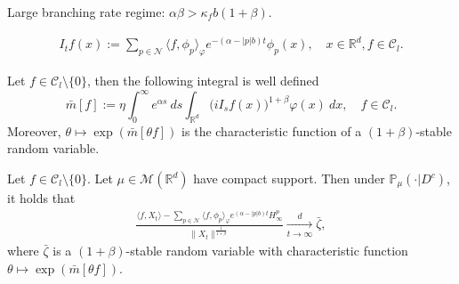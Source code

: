 \documentclass[9pt]{beamer}
\begin{document}
\begin{frame}[allowframebreaks]{Large branching rate regime: $\alpha\beta > \kappa_f b (1+\beta)$.}
\begin{itemize}
\begin{align}\label{definition of Itf}
    I_tf(x)
    :=\sum_{p\in \mathcal{N}}\langle f, \phi_p\rangle_{\varphi} e^{-(\alpha-|p|b)t}\phi_p(x),
   \quad x\in \mathbb{R}^d, f\in \mathcal C_l.
\end{align}
\end{itemize}
\begin{lemma}
	Let $f\in \mathcal{C}_l\setminus\{0\}$, then the following integral is well defined
\[
	\bar{m}[f]
    := \eta\int_0^\infty e^{\alpha s}~ds \int_{\mathbb R^d} \big(iI_sf(x)\big)^{1+\beta} \varphi(x)~dx,
    \quad f\in \mathcal C_l.
\]
	Moreover, $\theta \mapsto \exp( \bar m[\theta f])$ is the characteristic function of a $(1+\beta)$-stable random variable.
\end{lemma}
\begin{theorem}
\label{thm: large clt}
    Let $f\in \mathcal{C}_l\setminus\{0\}$.
    Let $\mu\in \mathcal M(\mathbb R^d)$ have compact support. 
    Then under $\mathbb{P}_{\mu}(\cdot|D^c)$, it holds that
\begin{align}\label{thm: large rate}
    \frac{\langle f, X_t\rangle-\sum_{p\in\mathcal{N}}\langle f,\phi_p\rangle_\varphi e^{(\alpha-|p|b)t}H^p_{\infty}}{\|X_t\|^\frac{1}{1+\beta}}\xrightarrow[t\to \infty]{d}\bar{\zeta},
\end{align}
    where $\bar{\zeta}$ is a $(1+\beta)$-stable random variable with
    characteristic function $\theta \mapsto \exp( \bar m[\theta f])$.
\end{theorem}
\end{frame}
\end{document}
